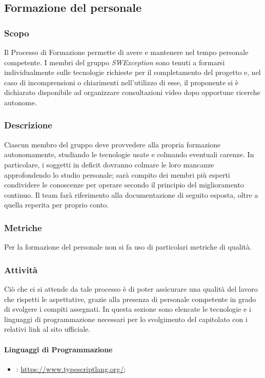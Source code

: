 \subsection{Formazione del personale} \label{_formazione}
\subsubsection{Scopo}
Il Processo di Formazione permette di avere e mantenere nel tempo personale competente. I membri del gruppo \textit{SWException} sono tenuti a formarsi individualmente sulle tecnologie richieste per il completamento del progetto e, nel caso di incomprensioni o chiarimenti nell'utilizzo di esse, il proponente si è dichiarato disponibile ad organizzare consultazioni video dopo opportune ricerche autonome.
\subsubsection{Descrizione}
Ciascun membro del gruppo deve provvedere alla propria formazione autonomamente,
studiando le tecnologie usate e colmando eventuali carenze. In particolare, i soggetti in
deficit dovranno colmare le loro mancanze approfondendo lo studio personale; sarà compito
dei membri più esperti condividere le conoscenze per operare secondo il principio del miglioramento continuo.
Il team farà riferimento alla documentazione di seguito esposta, oltre a quella reperita per
proprio conto.

\subsubsection{Metriche}
Per la formazione del personale non si fa uso di particolari metriche di qualità.

\subsubsection{Attività}
Ciò che ci si attende da tale processo è di poter assicurare una qualità del lavoro che
rispetti le aspettative, grazie alla presenza di personale competente in grado di
svolgere i compiti assegnati. In questa sezione sono elencate le tecnologie e i linguaggi di programmazione necessari per lo svolgimento del capitolato con i relativi link al sito ufficiale.

\paragraph{Linguaggi di Programmazione}
\begin{itemize}
    \item \textbf{}: \url{https://www.typescriptlang.org/};
\end{itemize}
